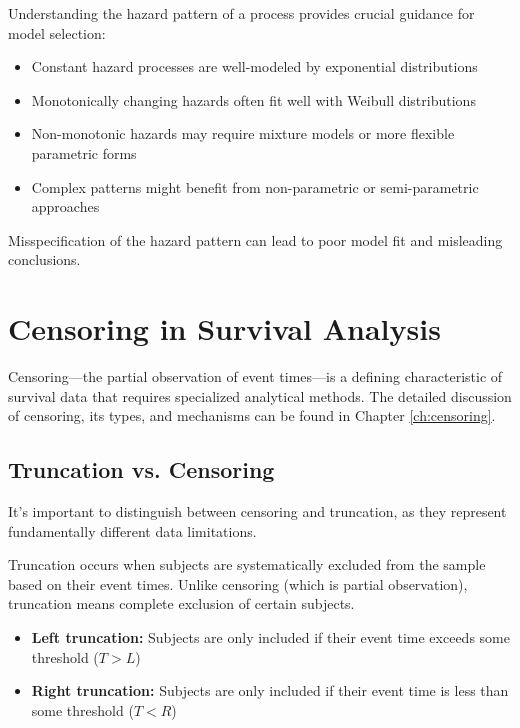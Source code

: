 \begin{notebox}[title=Implications for Modeling]
Understanding the hazard pattern of a process provides crucial guidance for model selection:
\begin{itemize}
    \item Constant hazard processes are well-modeled by exponential distributions
    \item Monotonically changing hazards often fit well with Weibull distributions
    \item Non-monotonic hazards may require mixture models or more flexible parametric forms
    \item Complex patterns might benefit from non-parametric or semi-parametric approaches
\end{itemize}

Misspecification of the hazard pattern can lead to poor model fit and misleading conclusions.
\end{notebox}

\section{Censoring in Survival Analysis}

Censoring—the partial observation of event times—is a defining characteristic of survival data that requires specialized analytical methods. The detailed discussion of censoring, its types, and mechanisms can be found in Chapter \ref{ch:censoring}.

\subsection{Truncation vs. Censoring}

It's important to distinguish between censoring and truncation, as they represent fundamentally different data limitations.

\begin{definitionbox}[title=Truncation]
Truncation occurs when subjects are systematically excluded from the sample based on their event times. Unlike censoring (which is partial observation), truncation means complete exclusion of certain subjects.

\begin{itemize}
    \item \textbf{Left truncation:} Subjects are only included if their event time exceeds some threshold ($T > L$)
    \item \textbf{Right truncation:} Subjects are only included if their event time is less than some threshold ($T < R$)
\end{itemize}
\end{definitionbox}

